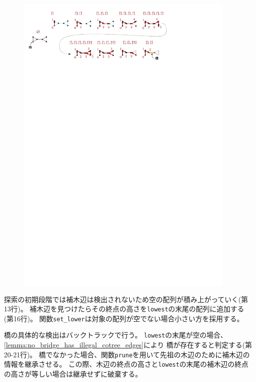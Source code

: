 \begin{figure}[ht]
    \centering
    \includegraphics[width=0.95\textwidth]{figures/bridge_illust.pdf}
\end{figure}






探索の初期段階では補木辺は検出されないため空の配列が積み上がっていく(第13行)。
補木辺を見つけたらその終点の高さを{\tt lowest}の末尾の配列に追加する(第16行)。
関数{\tt set\_lower}は対象の配列が空でない場合小さい方を採用する。

橋の具体的な検出はバックトラックで行う。
{\tt lowest}の末尾が空の場合、\cref{lemma:no_bridge_has_illegal_cotree_edges}により
橋が存在すると判定する(第20-21行)。
橋でなかった場合、関数{\tt prune}を用いて先祖の木辺のために補木辺の情報を継承させる。
この際、木辺の終点の高さと{\tt lowest}の末尾の補木辺の終点の高さが等しい場合は継承せずに破棄する。




